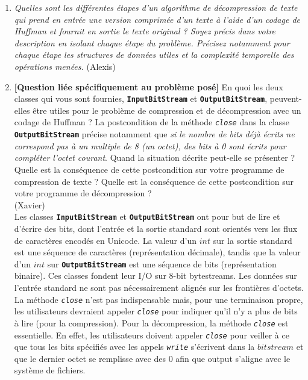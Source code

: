 \documentclass[11pt]{article}
\begin{document}
\begin{enumerate}
\item \textit{Quelles sont les différentes étapes d'un algorithme de décompression de texte qui prend en entrée une version comprimée d'un texte à l'aide d'un codage de Huffman et fournit en sortie le texte original ? Soyez précis dans votre description en isolant chaque étape du problème. Précisez notamment pour chaque étape les structures de données utiles et la complexité temporelle des opérations menées.} (Alexis) \bigskip \\

\item \textbf{[Question liée spécifiquement au problème posé]} En quoi les deux classes qui vous sont fournies, \texttt{\textbf{InputBitStream}} et \texttt{\textbf{OutputBitStream}}, peuvent-elles être utiles pour le problème de compression et de décompression avec un codage de Huffman ? La postcondition de la méthode \texttt{\textit{close}} dans la classe \texttt{\textbf{OutputBitStream}} précise notamment que \textit{si le nombre de bits déjà écrits ne correspond pas à un multiple de 8 (un octet), des bits à 0 sont écrits pour compléter l’octet courant}.
Quand la situation décrite peut-elle se présenter ? Quelle est la conséquence de
cette postcondition sur votre programme de compression de texte ? Quelle est la
conséquence de cette postcondition sur votre programme de décompression ? \\(Xavier) \bigskip \\
Les classes \texttt{\textbf{InputBitStream}} et \texttt{\textbf{OutputBitStream}} ont pour but de lire et d'écrire des bits, dont l'entrée et la sortie standard sont orientés vers les flux de caractères encodés en Unicode. La valeur d'un $int$ sur la sortie standard est une séquence de caractères (représentation décimale), tandis que la valeur d'un $int$ sur \texttt{\textbf{OutputBitStream}} est une séquence de bits (représentation binaire). Ces classes  fondent leur I/O sur 8-bit bytestreams. Les données sur l'entrée standard ne sont pas nécessairement alignés sur les frontières d'octets. La méthode \texttt{\textit{close}} n'est pas indispensable mais, pour une terminaison propre, les utilisateurs devraient appeler \texttt{\textit{close}} pour indiquer qu'il n'y a plus de bits à lire (pour la compression). Pour la décompression, la méthode \texttt{\textit{close}} est essentielle. En effet, les utilisateurs doivent appeler \texttt{\textit{close}} pour veiller à ce que tous les bits spécifiés avec les appels \texttt{\textit{write}} s'écrivent dans la $bitstream$ et que le dernier octet se remplisse avec des 0 afin que output s'aligne avec le système de fichiers. 
\bigskip





\end{enumerate}
\end{document}
